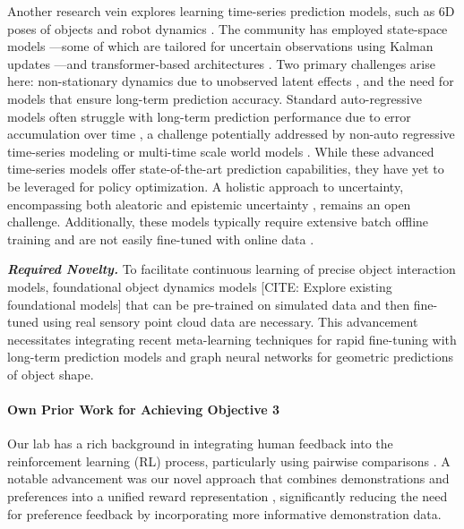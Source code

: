 \documentclass{erc-B2}
\begin{document}
Another research vein explores learning time-series prediction models, such as 6D poses of objects \cite{duffhauss22MV6D} and robot dynamics \cite{shaj2020acrkn}. The community has employed state-space models \cite{gu2021efficiently, smith2022simplified, becker19RKN}—some of which are tailored for uncertain observations using Kalman updates \cite{kalman1960}—and transformer-based architectures \cite{vaswani2017attention,zhou2021informer,liu2022Transformer}. Two primary challenges arise here: non-stationary dynamics due to unobserved latent effects \cite{shaj2022hiprssm,liu2022Transformer}, and the need for models that ensure long-term prediction accuracy. Standard auto-regressive models often struggle with long-term prediction performance due to error accumulation over time \cite{lecun2022path,zeng2018learning}, a challenge potentially addressed by non-auto regressive time-series modeling or multi-time scale world models \cite{shaj2023mts3}. While these advanced time-series models offer state-of-the-art prediction capabilities, they have yet to be leveraged for policy optimization. A holistic approach to uncertainty, encompassing both aleatoric \cite{becker19RKN} and epistemic uncertainty \cite{chua2018deep}, remains an open challenge. Additionally, these models typically require extensive batch offline training and are not easily fine-tuned with online data .

\textbf{\textit{Required Novelty.}} To facilitate continuous learning of precise object interaction models, foundational object dynamics models [CITE: Explore existing foundational models] that can be pre-trained on simulated data \cite{pfaff2021learning} and then fine-tuned using real sensory point cloud data are necessary. This advancement necessitates integrating recent meta-learning techniques \cite{Volpp23} for rapid fine-tuning with long-term prediction models \cite{shaj2023mts3} and graph neural networks for geometric predictions of object shape.

\paragraph{Own Prior Work for Achieving Objective 3} Our lab has a rich background in integrating human feedback into the reinforcement learning (RL) process, particularly using pairwise comparisons \cite{wirth2016PrefRL, wirth2017PrefSurvey, pinsler2018PrefGrasp}. A notable advancement was our novel approach that combines demonstrations and preferences into a unified reward representation \cite{taranovic2023ailp}, significantly reducing the need for preference feedback by incorporating more informative demonstration data. %
\end{document}
